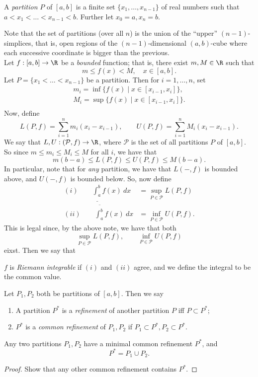 \documentclass{notes}
\begin{document}
\begin{defn}
  A \emph{partition} $P$ of $[a,b]$ is a finite set $\{x_1, \dots, x_{n-1}\}$ of real numbers such
  that $a < x_1 < \dots < x_{n-1} < b$. Further let $x_0 = a, x_n = b$.
\end{defn}
Note that the set of partitions (over all $n$) is the union of the ``upper'' $(n-1)$-simplices, that
is, open regions of the $(n-1)$-dimensional $(a,b)$-cube where each successive coordinate is bigger
than the previous. \\

Let $f: [a,b] \to \R$ be a \emph{bounded} function; that is, there exist $m, M\in\R$ such that 
$$m \leq f(x) < M, \quad x\in[a,b].$$
Let $P = \{x_1 < \dots < x_{n-1}\}$ be a partition. Then for $i=1, \dots, n$, set 
\begin{gather*}
  m_i = \inf \{f(x) \mid x\in [x_{i-1}, x_i] \}, \\
  M_i = \sup \{f(x) \mid x\in [x_{i-1}, x_i] \}. \\
\end{gather*}
Now, define 
$$L(P, f) = \sum_{i=1}^n m_i (x_i - x_{i-1}), \qquad U(P, f) = \sum_{i=1}^n M_i (x_i - x_{i-1}).$$
We say that $L, U: (\mathcal{P}, f) \to \R$, where $\mathcal{P}$ is the set of all partitions $P$ of
$[a,b]$.  So since $m \leq m_i \leq M_i \leq M$ for all $i$, we have that 
$$m(b-a) \leq L(P, f) \leq U(P, f) \leq M(b-a).$$
In particular, note that for \emph{any} partition, we have that $L(-, f)$ is bounded above, and
$U(-, f)$ is bounded below. So, now define
\begin{align*}
  (i)\qquad  \underline{\int_a^b} f(x)\ dx &= \sup_{P\in\mathcal{P}} L(P, f) \\
  (ii)\qquad  \overline{\int_a^b} f(x)\ dx &= \inf_{P\in\mathcal{P}} U(P, f).
\end{align*}
This is legal since, by the above note, we have that both
$$\sup_{P\in\mathcal{P}} L(P, f), \qquad \inf_{P\in\mathcal{P}} U(P, f)$$
eixst.  Then we say that 
\begin{defn}
  $f$ is \emph{Riemann integrable} if $(i)$ and $(ii)$ agree, and we define the integral to be the
  common value.
\end{defn}

\begin{defn}[Refinements]
  Let $P_1, P_2$ both be partitions of $[a,b]$. Then we say 
  \begin{enumerate}
    \item A partition $P^*$ is a \emph{refinement} of another partition $P$ iff $P \subset P^*$;
    \item $P^*$ is a \emph{common refinement} of $P_1, P_2$ if $P_1 \subset P^*, P_2 \subset P^*$.
  \end{enumerate}
\end{defn}
\begin{proposition}
  Any two partitions $P_1, P_2$ have a minimal common refinement $P^*$, and $$P^* = P_1 \cup P_2.$$
\end{proposition}
\begin{proof}
  Show that any other common refinement contains $P^*$.
\end{proof}
\end{document}
